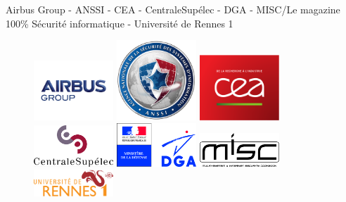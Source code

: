 \begin{center}
Airbus Group - ANSSI -  CEA - CentraleSup\'elec - DGA - MISC/Le magazine 100\% S\'ecurit\'e informatique - Universit\'e de Rennes 1
\end{center}

\begin{figure}[h]
\begin{center}
\parbox{3cm}{\includegraphics[width=3cm]{_images/airbus}}
\hfill
\parbox{3cm}{\includegraphics[width=3cm]{_images/anssi}}
\hfill
\parbox{3cm}{\includegraphics[width=3cm]{_images/cea}}
\end{center}
\vfill
\begin{center}
\parbox{3cm}{\includegraphics[width=3cm]{_images/centrale-supelec}}
\hfill
\parbox{3cm}{\includegraphics[width=3cm]{_images/dga}}
\hfill
\parbox{3cm}{\includegraphics[width=3cm]{_images/misc}}
\end{center}
\vfill
\begin{center}
\parbox{3cm}{\includegraphics[width=3cm]{_images/uni-rennes1}}
\end{center}
\end{figure}

